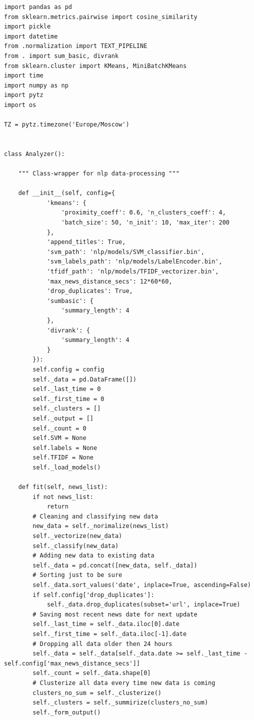 \documentclass[a4paper, 14pt]{extarticle}
\begin{document}
\clearpage
	\begin{verbatim}
import pandas as pd
from sklearn.metrics.pairwise import cosine_similarity
import pickle
import datetime
from .normalization import TEXT_PIPELINE
from . import sum_basic, divrank
from sklearn.cluster import KMeans, MiniBatchKMeans
import time
import numpy as np
import pytz
import os

TZ = pytz.timezone('Europe/Moscow')


class Analyzer():

    """ Class-wrapper for nlp data-processing """

    def __init__(self, config={
            'kmeans': {
                'proximity_coeff': 0.6, 'n_clusters_coeff': 4,
                'batch_size': 50, 'n_init': 10, 'max_iter': 200
            },
            'append_titles': True,
            'svm_path': 'nlp/models/SVM_classifier.bin',
            'svm_labels_path': 'nlp/models/LabelEncoder.bin',
            'tfidf_path': 'nlp/models/TFIDF_vectorizer.bin',
            'max_news_distance_secs': 12*60*60,
            'drop_duplicates': True,
            'sumbasic': {
                'summary_length': 4
            },
            'divrank': {
                'summary_length': 4
            }
        }):
        self.config = config
        self._data = pd.DataFrame([])
        self._last_time = 0
        self._first_time = 0
        self._clusters = []
        self._output = []
        self._count = 0
        self.SVM = None
        self.labels = None
        self.TFIDF = None
        self._load_models()

    def fit(self, news_list):
        if not news_list:
            return
        # Cleaning and classifying new data
        new_data = self._norimalize(news_list)
        self._vectorize(new_data)
        self._classify(new_data)
        # Adding new data to existing data
        self._data = pd.concat([new_data, self._data])
        # Sorting just to be sure
        self._data.sort_values('date', inplace=True, ascending=False)
        if self.config['drop_duplicates']:
            self._data.drop_duplicates(subset='url', inplace=True)
        # Saving most recent news date for next update
        self._last_time = self._data.iloc[0].date
        self._first_time = self._data.iloc[-1].date
        # Dropping all data older then 24 hours
        self._data = self._data[self._data.date >= self._last_time - self.config['max_news_distance_secs']]
        self._count = self._data.shape[0]
        # Clusterize all data every time new data is coming
        clusters_no_sum = self._clusterize()
        self._clusters = self._summirize(clusters_no_sum)
        self._form_output()


\end{verbatim}
\end{document}

